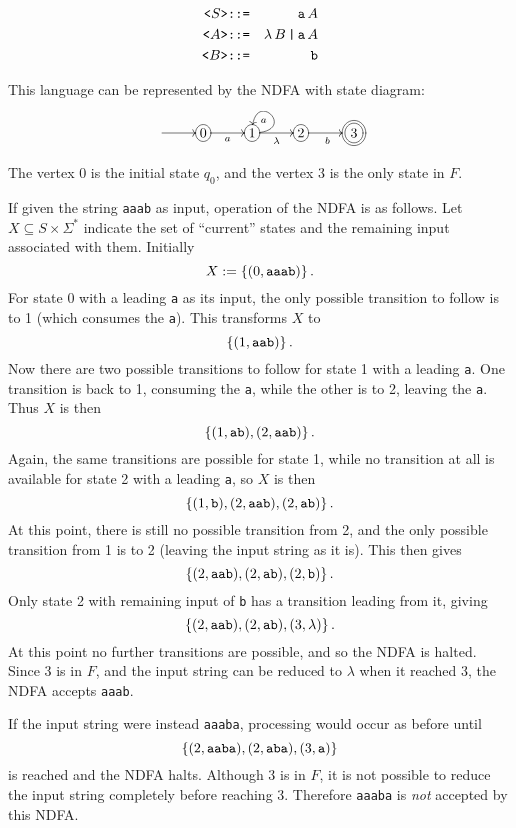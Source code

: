\documentclass[12pt]{article}
\begin{document}
\begin{eqnarray*}
\verb.<.S\verb.>. & \verb.::=. & \verb=a=\,A \\
\verb.<.A\verb.>. & \verb.::=. & \lambda\,B\,\verb.|.\,\verb=a=\,A \\
\verb.<.B\verb.>. & \verb.::=. & \verb=b=
\end{eqnarray*}

This language can be represented by the NDFA with state diagram:

$$
\UseComputerModernTips
\xymatrix{
\ar[r] &
*+[o][F-]{0} \ar[r]_a &
*+[o][F-]{1} \ar@(r,u)[]^a \ar[r]_\lambda &
*+[o][F-]{2} \ar[r]_b &
*++[o][F=]{3}}
$$

The vertex 0 is the initial state $q_0$, and the vertex 3 is the only state in $F$.

If given the string \verb=aaab= as input, operation of the NDFA is as follows.
Let $X\subseteq S\times\Sigma^*$ indicate the set of ``current'' states and the remaining input associated with them.  Initially $$X := \left\{ (0, \verb=aaab=) \right\}.$$
For state 0 with a leading \verb=a= as its input, the only possible transition to follow is to 1 (which consumes the \verb=a=).  This transforms $X$ to
$$\left\{ (1, \verb=aab=) \right\}.$$  Now there are two possible transitions to follow for state 1 with a leading \verb=a=.  One transition is back to 1, consuming the \verb=a=, while the other is to 2, leaving the \verb=a=.  Thus
$X$ is then $$\left\{ (1, \verb=ab=), (2, \verb=aab=) \right\}.$$
Again, the same transitions are possible for state 1, while no transition at all is available for state 2 with a leading \verb=a=, so $X$ is then
$$\left\{ (1, \verb=b=), (2, \verb=aab=), (2, \verb=ab=) \right\}.$$
At this point, there is still no possible transition from 2, and the only possible transition from 1 is to 2 (leaving the input string as it is).  This then gives $$\left\{ (2, \verb=aab=), (2, \verb=ab=), (2, \verb=b=) \right\}.$$
Only state 2 with remaining input of \verb=b= has a transition leading from it,
giving $$\left\{ (2, \verb=aab=), (2, \verb=ab=), (3, \lambda) \right\}.$$  At this point no further transitions are possible, and so the NDFA is halted.  Since 3 is in $F$, and the input string can be reduced to $\lambda$ when it reached 3, the NDFA accepts \verb=aaab=.

If the input string were instead \verb=aaaba=, processing would occur as before until \\ $$\left\{ (2, \verb=aaba=), (2, \verb=aba=), (3, \verb=a=) \right\}$$ is reached and the NDFA halts.  Although 3 is in $F$, it is not possible to reduce the input string completely before reaching 3.  Therefore \verb=aaaba= is \emph{not} accepted by this NDFA.
\end{document}
